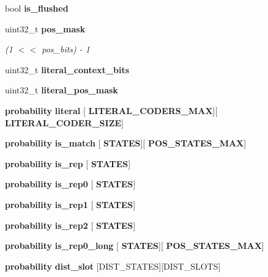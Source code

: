 \begin{DoxyCompactItemize}
\item 
bool \textbf{ is\+\_\+flushed}
\item 
uint32\+\_\+t \textbf{ pos\+\_\+mask}
\begin{DoxyCompactList}\small\item\em (1 $<$$<$ pos\+\_\+bits) -\/ 1 \end{DoxyCompactList}\item 
\mbox{\label{structlzma__lzma1__encoder__s_a7074344d30ad3d8ed673e2e1fda68fc9}} 
uint32\+\_\+t {\bfseries literal\+\_\+context\+\_\+bits}
\item 
\mbox{\label{structlzma__lzma1__encoder__s_ab3efbc02948d684056a278272262186e}} 
uint32\+\_\+t {\bfseries literal\+\_\+pos\+\_\+mask}
\item 
\mbox{\label{structlzma__lzma1__encoder__s_a0e0a3bd3ae4db8bb3fc60e7dbc82534f}} 
\textbf{ probability} {\bfseries literal} [\textbf{ L\+I\+T\+E\+R\+A\+L\+\_\+\+C\+O\+D\+E\+R\+S\+\_\+\+M\+AX}][\textbf{ L\+I\+T\+E\+R\+A\+L\+\_\+\+C\+O\+D\+E\+R\+\_\+\+S\+I\+ZE}]
\item 
\mbox{\label{structlzma__lzma1__encoder__s_aef24e8ec7c8a3959b5e3c58cf463cab3}} 
\textbf{ probability} {\bfseries is\+\_\+match} [\textbf{ S\+T\+A\+T\+ES}][\textbf{ P\+O\+S\+\_\+\+S\+T\+A\+T\+E\+S\+\_\+\+M\+AX}]
\item 
\mbox{\label{structlzma__lzma1__encoder__s_a8a619166d32663545eb9162ebbad84d5}} 
\textbf{ probability} {\bfseries is\+\_\+rep} [\textbf{ S\+T\+A\+T\+ES}]
\item 
\mbox{\label{structlzma__lzma1__encoder__s_a369e3db7666a9d900e4b4d549abcbb99}} 
\textbf{ probability} {\bfseries is\+\_\+rep0} [\textbf{ S\+T\+A\+T\+ES}]
\item 
\mbox{\label{structlzma__lzma1__encoder__s_a1a8bde0fc886591ee0801af89a1a58b7}} 
\textbf{ probability} {\bfseries is\+\_\+rep1} [\textbf{ S\+T\+A\+T\+ES}]
\item 
\mbox{\label{structlzma__lzma1__encoder__s_a43d9523584c25496796727268f256c7a}} 
\textbf{ probability} {\bfseries is\+\_\+rep2} [\textbf{ S\+T\+A\+T\+ES}]
\item 
\mbox{\label{structlzma__lzma1__encoder__s_a0f5eb867e78bfcd3f398ce3a0faec040}} 
\textbf{ probability} {\bfseries is\+\_\+rep0\+\_\+long} [\textbf{ S\+T\+A\+T\+ES}][\textbf{ P\+O\+S\+\_\+\+S\+T\+A\+T\+E\+S\+\_\+\+M\+AX}]
\item 
\mbox{\label{structlzma__lzma1__encoder__s_aba6c402c4d400cae9af492c71c5671b6}} 
\textbf{ probability} {\bfseries dist\+\_\+slot} [D\+I\+S\+T\+\_\+\+S\+T\+A\+T\+ES][D\+I\+S\+T\+\_\+\+S\+L\+O\+TS]

\end{DoxyCompactItemize}
